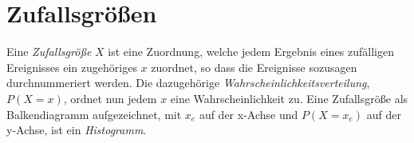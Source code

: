 \documentclass{article}
\begin{document}
\section{Zufallsgrößen} 
Eine \emph{Zufallsgröße} $X$ ist eine Zuordnung, welche jedem Ergebnis eines zufälligen Ereignisses ein zugehöriges $x$ zuordnet, so dass die Ereignisse sozusagen durchnummeriert werden. Die dazugehörige \emph{Wahrscheinlichkeitsverteilung}, $P(X=x)$, ordnet nun jedem $x$ eine Wahrscheinlichkeit zu. \newline
Eine Zufallsgröße als Balkendiagramm aufgezeichnet, mit $x_e$ auf der x-Achse und $P(X=x_e)$ auf der y-Achse, ist ein \emph{Histogramm}.
\end{document}
